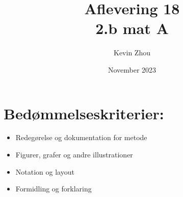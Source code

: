 \documentclass{article}
\title{Aflevering 18\\
{\Large \textbf{2.b mat A}}}
\author{Kevin Zhou}
\date{November 2023}
\begin{document}
\maketitle
\section*{Bedømmelseskriterier:}
\begin{itemize}
    \setlength\itemsep{3cm}
    \Large
    \item  Redegørelse og dokumentation for metode
    \item Figurer, grafer og andre illustrationer
    \item Notation og layout
    \item Formidling og forklaring
\end{itemize}
\pagebreak
\end{document}
